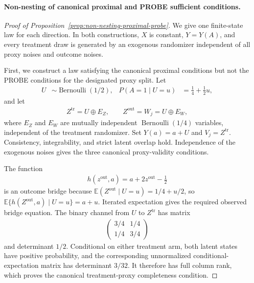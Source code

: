 \paragraph{Non-nesting of canonical proximal and PROBE sufficient conditions.}
\begin{proof}[Proof of Proposition~\ref{prop:non-nesting-proximal-probe}]
We give one finite-state law for each direction. In both constructions, $X$ is constant, $Y=Y(A)$, and every treatment draw is generated by an exogenous randomizer independent of all proxy noises and outcome noises.

First, we construct a law satisfying the canonical proximal conditions but not the PROBE conditions for the designated proxy split. Let
\begin{align*}
U&\sim\operatorname{Bernoulli}(1/2),
&P(A=1\mid U=u)&=\frac14+\frac12u,
\end{align*}
and let
\begin{align*}
Z^{\mathrm{tr}}=U\mathbin\oplus E_Z,
\qquad
Z^{\mathrm{out}}=W_j=U\mathbin\oplus E_W,
\end{align*}
where $E_Z$ and $E_W$ are mutually independent $\operatorname{Bernoulli}(1/4)$ variables, independent of the treatment randomizer. Set $Y(a)=a+U$ and $V_j=Z^{\mathrm{tr}}$. Consistency, integrability, and strict latent overlap hold. Independence of the exogenous noises gives the three canonical proxy-validity conditions.

The function
\begin{align*}
h(z^{\mathrm{out}},a)=a+2z^{\mathrm{out}}-\frac12
\end{align*}
is an outcome bridge because $\mathbb E(Z^{\mathrm{out}}\mid U=u)=1/4+u/2$, so $\mathbb E\{h(Z^{\mathrm{out}},a)\mid U=u\}=a+u$. Iterated expectation gives the required observed bridge equation. The binary channel from $U$ to $Z^{\mathrm{tr}}$ has matrix
\begin{align*}
\begin{pmatrix}
3/4&1/4\\
1/4&3/4
\end{pmatrix}
\end{align*}
and determinant $1/2$. Conditional on either treatment arm, both latent states have positive probability, and the corresponding unnormalized conditional-expectation matrix has determinant $3/32$. It therefore has full column rank, which proves the canonical treatment-proxy completeness condition.


\end{proof}
